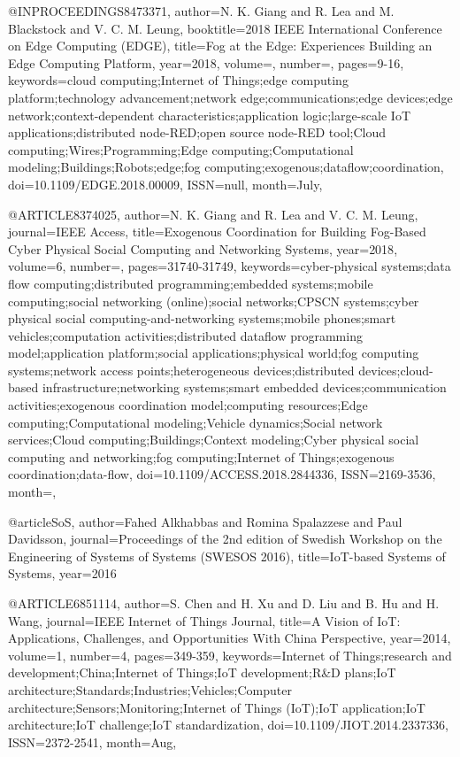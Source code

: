 

@INPROCEEDINGS{8473371,
    author={N. K. {Giang} and R. {Lea} and M. {Blackstock} and V. C. M. {Leung}},
    booktitle={2018 IEEE International Conference on Edge Computing (EDGE)},
    title={Fog at the Edge: Experiences Building an Edge Computing Platform},
    year={2018},
    volume={},
    number={},
    pages={9-16},
    keywords={cloud computing;Internet of Things;edge computing platform;technology advancement;network edge;communications;edge devices;edge network;context-dependent characteristics;application logic;large-scale IoT applications;distributed node-RED;open source node-RED tool;Cloud computing;Wires;Programming;Edge computing;Computational modeling;Buildings;Robots;edge;fog computing;exogenous;dataflow;coordination},
    doi={10.1109/EDGE.2018.00009},
    ISSN={null},
    month={July},
}

@ARTICLE{8374025,
    author={N. K. {Giang} and R. {Lea} and V. C. M. {Leung}},
    journal={IEEE Access},
    title={Exogenous Coordination for Building Fog-Based Cyber Physical Social Computing and Networking Systems},
    year={2018},
    volume={6},
    number={},
    pages={31740-31749},
    keywords={cyber-physical systems;data flow computing;distributed programming;embedded systems;mobile computing;social networking (online);social networks;CPSCN systems;cyber physical social computing-and-networking systems;mobile phones;smart vehicles;computation activities;distributed dataflow programming model;application platform;social applications;physical world;fog computing systems;network access points;heterogeneous devices;distributed devices;cloud-based infrastructure;networking systems;smart embedded devices;communication activities;exogenous coordination model;computing resources;Edge computing;Computational modeling;Vehicle dynamics;Social network services;Cloud computing;Buildings;Context modeling;Cyber physical social computing and networking;fog computing;Internet of Things;exogenous coordination;data-flow},
    doi={10.1109/ACCESS.2018.2844336},
    ISSN={2169-3536},
    month={},
}

@article{SoS,
    author={Fahed Alkhabbas and Romina Spalazzese and Paul Davidsson},
    journal={Proceedings of the 2nd edition of Swedish Workshop on the Engineering of Systems of Systems (SWESOS 2016)},
    title={IoT-based Systems of Systems},
    year={2016}
}

@ARTICLE{6851114,
    author={S. {Chen} and H. {Xu} and D. {Liu} and B. {Hu} and H. {Wang}},
    journal={IEEE Internet of Things Journal},
    title={A Vision of IoT: Applications, Challenges, and Opportunities With China Perspective},
    year={2014},
    volume={1},
    number={4},
    pages={349-359},
    keywords={Internet of Things;research and development;China;Internet of Things;IoT development;R&D plans;IoT architecture;Standards;Industries;Vehicles;Computer architecture;Sensors;Monitoring;Internet of Things (IoT);IoT application;IoT architecture;IoT challenge;IoT standardization},
    doi={10.1109/JIOT.2014.2337336},
    ISSN={2372-2541},
    month={Aug},
}

